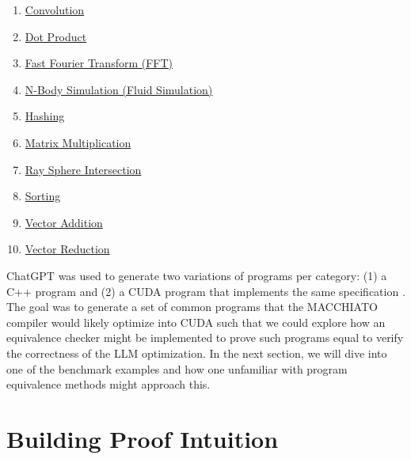 \documentclass{article}
\begin{document}
\begin{enumerate}
    \item \href{https://github.com/mocha-macchiato-compiler/macchiato/tree/main/benchmarks/convolution}{Convolution}
    \item \href{https://github.com/mocha-macchiato-compiler/macchiato/tree/main/benchmarks/dot_product}{Dot Product}
    \item \href{https://github.com/mocha-macchiato-compiler/macchiato/tree/main/benchmarks/fft}{Fast Fourier Transform (FFT)}
    \item \href{https://github.com/mocha-macchiato-compiler/macchiato/tree/main/benchmarks/fluid_simulation}{N-Body Simulation (Fluid Simulation)}
    \item \href{https://github.com/mocha-macchiato-compiler/macchiato/tree/main/benchmarks/hashing}{Hashing}
    \item \href{https://github.com/mocha-macchiato-compiler/macchiato/tree/main/benchmarks/mat_mult}{Matrix Multiplication}
    \item \href{https://github.com/mocha-macchiato-compiler/macchiato/tree/main/benchmarks/ray_sphere_intersection}{Ray Sphere Intersection}
    \item \href{https://github.com/mocha-macchiato-compiler/macchiato/tree/main/benchmarks/sorting}{Sorting}
    \item \href{https://github.com/mocha-macchiato-compiler/macchiato/tree/main/benchmarks/vector_addition}{Vector Addition}
    \item \href{https://github.com/mocha-macchiato-compiler/macchiato/tree/main/benchmarks/vector_reduction}{Vector Reduction}
\end{enumerate}

ChatGPT was used to generate two variations of programs per category: (1) a C++ program and (2) a CUDA program that implements the same specification \cite{benchmarks_repo}. The goal was to generate a set of common programs that the MACCHIATO compiler would likely optimize into CUDA such that we could explore how an equivalence checker might be implemented to prove such programs equal to verify the correctness of the LLM optimization. In the next section, we will dive into one of the benchmark examples and how one unfamiliar with program equivalence methods might approach this.

\section{Building Proof Intuition}
\end{document}
